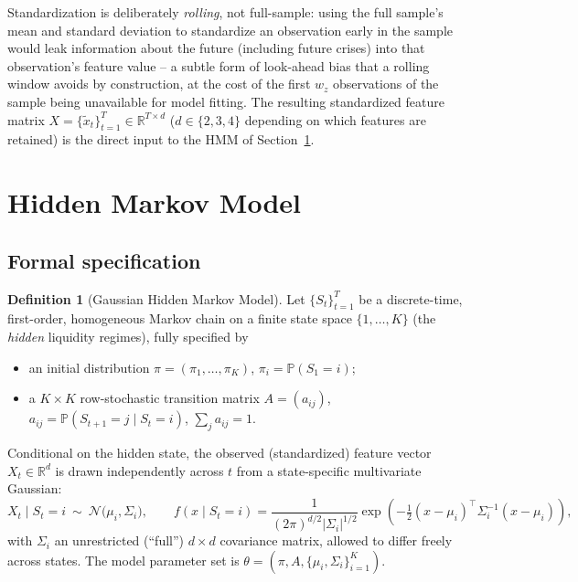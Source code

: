 \documentclass[11pt]{article}
\theoremstyle{definition}
\newtheorem{definition}[theorem]{Definition}
\theoremstyle{remark}
\begin{document}
Standardization is deliberately \emph{rolling}, not full-sample: using the full sample's mean and standard deviation to standardize an observation early in the sample would leak information about the future (including future crises) into that observation's feature value -- a subtle form of look-ahead bias that a rolling window avoids by construction, at the cost of the first $w_z$ observations of the sample being unavailable for model fitting. The resulting standardized feature matrix $X=\{\widetilde{x}_t\}_{t=1}^{T}\in\mathbb{R}^{T\times d}$ ($d\in\{2,3,4\}$ depending on which features are retained) is the direct input to the HMM of Section~\ref{sec:hmm}.

\section{Hidden Markov Model}
\label{sec:hmm}

\subsection{Formal specification}
\label{sec:hmm-spec}

\begin{definition}[Gaussian Hidden Markov Model]
Let $\{S_t\}_{t=1}^{T}$ be a discrete-time, first-order, homogeneous Markov chain on a finite state space $\{1,\dots,K\}$ (the \emph{hidden} liquidity regimes), fully specified by
\begin{itemize}
    \item an initial distribution $\pi=(\pi_1,\dots,\pi_K)$, $\pi_i=\mathbb{P}(S_1=i)$;
    \item a $K\times K$ row-stochastic transition matrix $A=(a_{ij})$, $a_{ij}=\mathbb{P}(S_{t+1}=j\mid S_t=i)$, $\sum_j a_{ij}=1$.
\end{itemize}
Conditional on the hidden state, the observed (standardized) feature vector $X_t\in\mathbb{R}^d$ is drawn independently across $t$ from a state-specific multivariate Gaussian:
\[
X_t \mid S_t=i \ \sim\ \mathcal{N}\big(\mu_i,\Sigma_i\big), \qquad
f(x\mid S_t=i) = \frac{1}{(2\pi)^{d/2}|\Sigma_i|^{1/2}}\exp\!\left(-\tfrac12(x-\mu_i)^\top\Sigma_i^{-1}(x-\mu_i)\right),
\]
with $\Sigma_i$ an unrestricted (``full'') $d\times d$ covariance matrix, allowed to differ freely across states. The model parameter set is $\theta=(\pi,A,\{\mu_i,\Sigma_i\}_{i=1}^K)$.
\end{definition}
\end{document}
